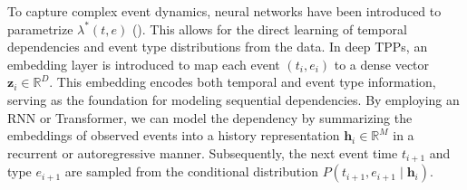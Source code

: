 To capture complex event dynamics, neural networks have been introduced to parametrize $\lambda^*(t,e)$ (). This allows for the direct learning of temporal dependencies and event type distributions from the data. In deep TPPs, an embedding layer is introduced to map each event $(t_i, e_i)$ to a dense vector $\mathbf{z}_i \in \mathbb{R}^D$. This embedding encodes both temporal and event type information, serving as the foundation for modeling sequential dependencies. 
By employing an RNN or Transformer, we can model the dependency by summarizing the embeddings of observed events into a history representation \(\mathbf{h}_i \in \mathbb{R}^M\) in a recurrent or autoregressive manner. 
Subsequently, the next event time $t_{i+1}$ and type $e_{i+1}$ are sampled from the conditional distribution $P(t_{i+1},e_{i+1}\mid \mathbf{h}_i)$. 




